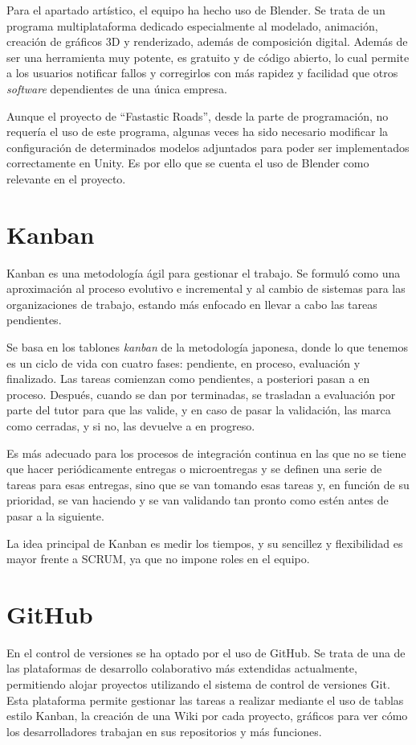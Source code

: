 Para el apartado artístico, el equipo ha hecho uso de Blender. Se trata de un programa multiplataforma dedicado especialmente al modelado, animación, creación de gráficos 3D y renderizado, además de composición digital. Además de ser una herramienta muy potente, es gratuito y de código abierto, lo cual permite a los usuarios notificar fallos y corregirlos con más rapidez y facilidad que otros \textit{software} dependientes de una única empresa.

Aunque el proyecto de ``Fastastic Roads'', desde la parte de programación, no requería el uso de este programa, algunas veces ha sido necesario modificar la configuración de determinados modelos adjuntados para poder ser implementados correctamente en Unity. Es por ello que se cuenta el uso de Blender como relevante en el proyecto.

\section{Kanban}

Kanban es una metodología ágil para gestionar el trabajo. Se formuló como una aproximación al proceso evolutivo e incremental y al cambio de sistemas para las organizaciones de trabajo, estando más enfocado en llevar a cabo las tareas pendientes. 

Se basa en los tablones \textit{kanban} de la metodología japonesa, donde lo que tenemos es un ciclo de vida con cuatro fases: pendiente, en proceso, evaluación y finalizado. Las tareas comienzan como pendientes, a posteriori pasan a en proceso. Después, cuando se dan por terminadas, se trasladan a evaluación por parte del tutor para que las valide, y en caso de pasar la validación, las marca como cerradas, y si no, las devuelve a en progreso. 

Es más adecuado para los procesos de integración continua en las que no se tiene que hacer periódicamente entregas o microentregas y se definen una serie de tareas para esas entregas, sino que se van tomando esas tareas y, en función de su prioridad, se van haciendo y se van validando tan pronto como estén antes de pasar a la siguiente. 

La idea principal de Kanban es medir los tiempos, y su sencillez y flexibilidad es mayor frente a SCRUM, ya que no impone roles en el equipo.

\section{GitHub}

En el control de versiones se ha optado por el uso de GitHub. Se trata de una de las plataformas de desarrollo colaborativo más extendidas actualmente, permitiendo alojar proyectos utilizando el sistema de control de versiones Git. Esta plataforma permite gestionar las tareas a realizar mediante el uso de tablas estilo Kanban, la creación de una Wiki por cada proyecto, gráficos para ver cómo los desarrolladores trabajan en sus repositorios y más funciones.